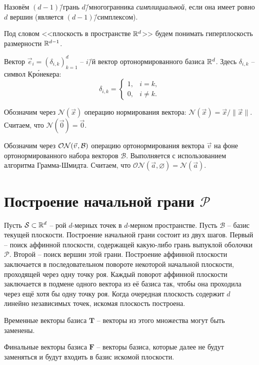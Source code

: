 \documentclass[a4paper,12pt]{article}
\newcommand{\R}[1][]{%
  \ifthenelse{\equal{#1}{}}%
  {\mathbb{R}}%
  {\mathbb{R}^{#1}}}
\newcommand{\Swarm}{\mathcal{S}}              %
\newcommand{\Polytop}{\mathcal{P}}         %
\newcommand{\Basis}{\mathcal{B}}              %
\newcommand{\ZVec}{\vec 0}                    %
\newcommand{\norm}[2][]{#1\lVert #2 #1\rVert}             %
\newcommand{\Norm}[2][]{\mathcal{N}#1( #2 #1)} %
\newcommand{\ONorm}[3][]{\mathcal{ON}#1( #2, #3 #1)} %
\newcommand{\TempVec}{\mathbf{T}}  %
\newcommand{\FinalVec}{\mathbf{F}} %
\renewcommand{\.}{\hspace{0.2ex}}
\begin{document}
  Назовём $(d-1)$\=/грань $d$\=/многогранника \textit{симплициальной}, если она имеет ровно $d$ вершин (является $(d-1)$\=/симплексом).



  Под словом <<плоскость в пространстве $\R[d]$>> будем понимать гиперплоскость размерности $\R[d-1]$.

  Вектор $\vec e_i = (\delta_{i,k})_{k=1}^d$ -- $i$\=/й вектор ортонормированного базиса $\R[d]$.
  Здесь $\delta_{i,k}$ -- символ Кр\'{о}некера:
  $$
  \delta_{i,k} =
  \begin{cases}
    1, & i=k, \\
    0, & i\neq k.
  \end{cases}
  $$

  Обозначим через $\Norm{\vec x}$ операцию нормирования вектора: $\Norm{\vec x} = \vec x \big / \norm{\vec x}$. Считаем, что $\Norm{\ZVec} = \ZVec$.

  Обозначим через $\ONorm{\vec v \.}{\Basis}$ операцию ортонормирования вектора $\vec v$ на фоне ортонормированного набора векторов $\Basis$. Выполняется с использованием алгоритма Грамма-Шмидта. Считаем, что $\ONorm{\vec a}{\varnothing} = \Norm{\vec a}$.


\section{Построение начальной грани $\Polytop$}
  Пусть $\Swarm \subset \R[d]$ -- рой $d$-мерных точек в $d$-мерном пространстве.
  Пусть $\Basis$ -- базис текущей плоскости. Построение начальной грани состоит из двух шагов. Первый -- поиск аффинной плоскости, содержащей какую-либо грань выпуклой оболочки $\Polytop$. Второй -- поиск вершин этой грани. Построение аффинной плоскости заключается в последовательном повороте некоторой начальной плоскости, проходящей через одну точку роя. Каждый поворот аффинной плоскости заключается в подмене одного вектора из её базиса так, чтобы она проходила через ещё хотя бы одну точку роя. Когда очередная плоскость содержит $d$ линейно независимых точек, искомая плоскость построена.

  Временные векторы базиса $\TempVec$ -- векторы из этого множества могут быть заменены.

  Финальные векторы базиса $\FinalVec$ -- векторы базиса, которые далее не будут заменяться и будут входить в базис искомой плоскости.
\end{document}
